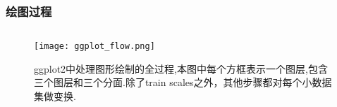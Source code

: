 \subsubsection{绘图过程}
\begin{frame}{\subsecname}{\subsubsecname}
\begin{figure}[ht]
  \begin{columns}
    \begin{column}{.6\textwidth}\centering
  \texttt{[image: ggplot\_flow.png]}
    \end{column}

    \begin{column}[c]{.4\textwidth}
  \caption{ggplot2中处理图形绘制的全过程,本图中每个方框表示一个图层,包含三个图层和三个分面.除了train scales之外，其他步骤都对每个小数据集做变换.}
    \end{column}
  \end{columns}
\end{figure}
\end{frame}

